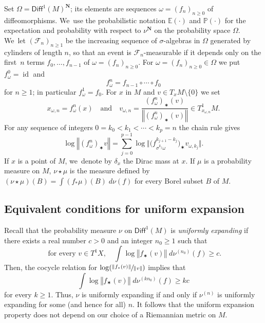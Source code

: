 \documentclass[11pt]{article}
\newcommand{\Psfrac}[2]{(\sfrac{#1}{#2})}
\newcommand{\norm}[1]{{\left\Vert#1\right\Vert}}
\newcommand{\bnorm}[1]{{\bigl\Vert#1\bigr\Vert}}
\newcommand{\blrpar}[1]{\bigl(#1\bigr)}
\DeclareMathOperator{\id}{id}
\newcommand{\ee}{\mathbb{E}}
\newcommand{\pp}{\mathbb{P}}\let\P\pp
\def\N{\mathbf{N}}
\newcommand\Diff{{\mathsf{Diff}}}
\theoremstyle{plain}
\theoremstyle{definition}
\numberwithin{equation}{section}
\begin{document}
Set $\Omega=\Diff^1(M)^\N$; its elements
are sequences $\omega = (f_n)_{n\geq 0}$ of diffeomorphisms. We~use the
probabilistic notation $\ee(\cdot)$ and $\pp(\cdot)$ for the expectation and probability with respect to $\nu^\N$
on the probability space $\Omega$. We~let
$(\mathcal F_n)_{n\geq 1}$ be the increasing sequence of $\sigma$-algebras in $\Omega$
generated by cylinders of length $n$, so that an event is $\mathcal F_n$-measurable if it depends only on
the first~$n$ terms $f_0, \ldots , f_{n-1}$ of $\omega=(f_n)_{n\geq 0}$.
For $\omega = (f_n)_{n\geq 0} \in \Omega$ we put $f^0_\omega=\id$ and
\begin{equation*}
f_\omega^n = f_{n-1}\circ \cdots \circ f_0
\end{equation*}
for $n\geq 1$; in particular $f_\omega^1 = f_0$. For $x$ in $M$ and $ v \in T_xM\setminus\{ 0\}$ we set
\begin{equation*}
x_{\omega, n} = f_\omega^n(x) \quad {\text{and}} \quad
v_{\omega, n} = \frac{ (f_\omega^n)_\varstar (v)} {\norm{ (f_\omega^n)_\varstar (v)}}\in T^1_{x_{\omega, n}}M.
\end{equation*}
For any sequence of integers
$0= k_0< k_1< \cdots < k_p = n$ the chain rule gives
\begin{equation}\label{eq:chain_rule}
\log\norm{(f_\omega^n)_\varstar v} = \sum_{j=0}^{p-1} \log \bnorm{ \blrpar{f^{k_{j+1}- k_j}_{\sigma^{k_j}\omega}}_\varstar { v_{\omega, k_j}}} .
\end{equation}
If $x$ is a point of $M$, we~denote by $\delta_x$ the Dirac mass at $x$. If $\mu$ is a probability measure on $M$, $\nu\star\mu$
is the measure defined by $(\nu\star\mu)(B)=\int (f_*\mu)(B) \; d\nu(f)$ for every Borel subset $B$ of $M$.

\subsection{Equivalent conditions for uniform expansion}

Recall that the probability measure $\nu$ on $\Diff^1(M)$ is \emph{uniformly expanding}
if there exists a real number $c>0$ and an integer $n_0\geq 1$ such that
\begin{equation}\label{eq:UEbisrepetita}
\text{ for every } v\in T^1X, \quad
\int \log {\norm{ f_\varstar ( v)}} \; d\nu^{(n_0)} (f) \geq c.
\end{equation}
Then, the cocycle relation for
$ \log \Psfrac{\norm{ f_\varstar ( v)}}{\norm{ v}}$ implies that
\begin{equation}\label{eq:UE_iteree}
\int \log {\norm{ f_\varstar ( v)}} \; d\nu^{(kn_0)}(f) \geq kc
\end{equation}
for every $k\geq 1$. Thus, $\nu$ is uniformly expanding if and only if
$\nu^{(n)}$ is uniformly expanding for some (and hence for all) $n$. It follows that the uniform expansion property
does not depend on our choice of a Riemannian metric on $M$.
\end{document}
